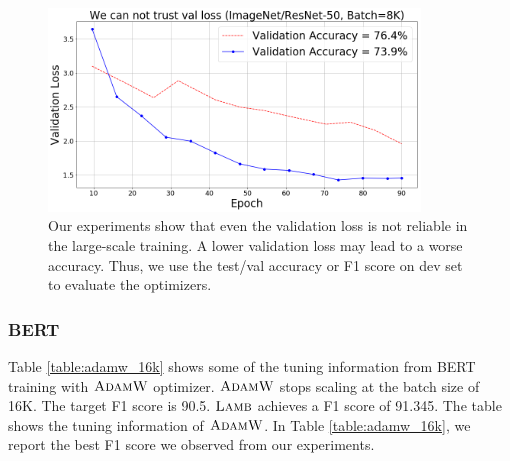 \begin{figure}[tb]
\vspace{5pt}
\centering
\includegraphics[width=0.88\textwidth]{figs/do_not_trust_val_loss.png}
\caption{Our experiments show that even the validation loss is not reliable in the large-scale training. A lower validation loss may lead to a worse accuracy. Thus, we use the test/val accuracy or F1 score on dev set to evaluate the optimizers.}
\label{fig:not_trust_val_loss}
\vspace{-10pt}
\end{figure}



\subsubsection{BERT}
Table \ref{table:adamw_16k} shows some of the tuning information from BERT training with $\textsc{AdamW}$ optimizer.
$\textsc{AdamW}$ stops scaling at the batch size of 16K. The target F1 score is 90.5. $\textsc{Lamb}$ achieves a F1 score of 91.345. The table shows the tuning information of $\textsc{AdamW}$. In Table \ref{table:adamw_16k}, we report the best F1 score we observed from our experiments.

